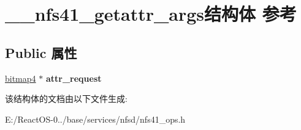 \hypertarget{struct____nfs41__getattr__args}{}\section{\+\_\+\+\_\+nfs41\+\_\+getattr\+\_\+args结构体 参考}
\label{struct____nfs41__getattr__args}
\subsection*{Public 属性}
\begin{DoxyCompactItemize}
\item 
\mbox{\label{struct____nfs41__getattr__args_a4cfb268daed0fc67a06151149d0805c9}} 
\hyperlink{struct____bitmap4}{bitmap4} $\ast$ {\bfseries attr\+\_\+request}
\end{DoxyCompactItemize}


该结构体的文档由以下文件生成\+:\begin{DoxyCompactItemize}
\item 
E\+:/\+React\+O\+S-\/0../base/services/nfsd/nfs41\+\_\+ops.\+h\end{DoxyCompactItemize}
